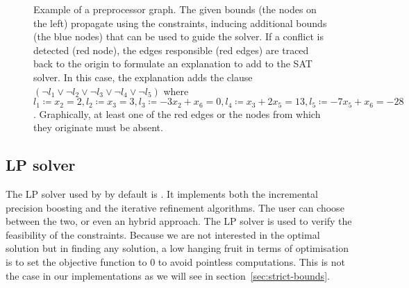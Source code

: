 \documentclass[runningheads]{llncs}
\begin{document}
\begin{figure}[h]
    \caption{Example of a preprocessor graph. The given bounds (the nodes on the left) propagate using the constraints, inducing additional bounds (the blue nodes) that can be used to guide the solver.
        If a conflict is detected (red node), the edges responsible (red edges) are traced back to the origin to formulate an explanation to add to the SAT solver.
        In this case, the explanation adds the clause $(\neg l_1 \lor \neg l_2 \lor \neg l_3 \lor \neg l_4 \lor \neg l_5)$ where $l_1 \coloneqq x_2 = 2, l_2 \coloneqq x_3 = 3, l_3 \coloneqq -3x_2 + x_6 = 0, l_4 \coloneqq x_3 + 2x_5 = 13, l_5 \coloneqq -7x_5 + x_6 = -28$.
        Graphically, at least one of the red edges or the nodes from which they originate must be absent.}
    \label{dg:preprocessor}
\end{figure}

\subsection{LP solver}

The LP solver used by \dlinear by default is \soplex.
It implements both the incremental precision boosting and the iterative refinement algorithms.
The user can choose between the two, or even an hybrid approach.
The LP solver is used to verify the feasibility of the constraints.
Because we are not interested in the optimal solution but in finding any solution, a low hanging fruit in terms of optimisation is to set the objective function to $0$ to avoid pointless computations.
This is not the case in our implementations as we will see in section~\ref{sec:strict-bounds}.
\end{document}
